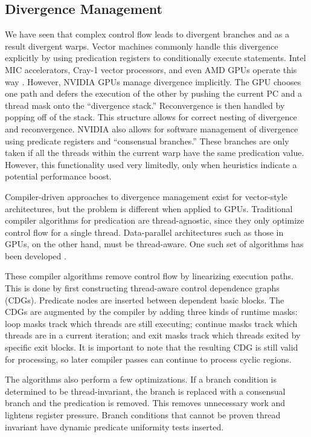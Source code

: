 \documentclass[prodmode,acmtecs]{acmsmall} %
\begin{document}
\subsection{Divergence Management}
We have seen that complex control flow leads to divergent branches and as a
result divergent warps. Vector machines commonly handle this divergence
explicitly by using predication registers to conditionally execute statements.
Intel MIC accelerators, Cray-1 vector processors, and even AMD GPUs operate this
way \cite{DivergenceManagment}. However, NVIDIA GPUs manage divergence
implicitly. The GPU chooses one path and defers the execution of the other by
pushing the current PC and a thread mask onto the ``divergence stack.''
Reconvergence is then handled by popping off of the stack. This structure allows
for correct nesting of divergence and reconvergence. NVIDIA also allows for
software management of divergence using predicate registers and ``consensual
branches.'' These branches are only taken if all the threads within the current
warp have the same predication value. However, this functionality used very
limitedly, only when heuristics indicate a potential performance boost.

Compiler-driven approaches to divergence management exist for vector-style
architectures, but the problem is different when applied to GPUs. Traditional
compiler algorithms for predication are thread-agnostic, since they only
optimize control flow for a single thread. Data-parallel architectures such as
those in GPUs, on the other hand, must be thread-aware. One such set of
algorithms has been developed \cite{DivergenceManagment}.

These compiler algorithms remove control flow by linearizing execution paths.
This is done by first constructing thread-aware control dependence graphs
(CDGs). Predicate nodes are inserted between dependent basic blocks. The CDGs
are augmented by the compiler by adding three kinds of runtime masks: loop masks
track which threads are still executing; continue masks track which threads are
in a current iteration; and exit masks track which threads exited by specific
exit blocks. It is important to note that the resulting CDG is still valid for
processing, so later compiler passes can continue to process cyclic regions.

The algorithms also perform a few optimizations. If a branch condition is
determined to be thread-invariant, the branch is replaced with a consensual
branch and the predication is removed. This removes unnecessary work and
lightens register pressure. Branch conditions that cannot be proven thread
invariant have dynamic predicate uniformity tests inserted.
\end{document}
